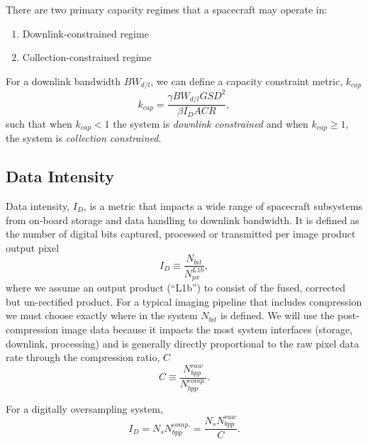 \documentclass[10pt,journal]{IEEEtran}  %
\begin{document}
There are two primary capacity regimes that a spacecraft may operate in:
\begin{enumerate}
\item Downlink-constrained regime
\item Collection-constrained regime
\end{enumerate}

For a downlink bandwidth $BW_{d/l}$, we can define a capacity constraint metric, $k_{cap}$
\begin{equation}
k_{cap} = \frac{\gamma BW_{d/l} GSD^2}{\beta I_D ACR},
\end{equation}
such that when $k_{cap} < 1$ the system is \emph{downlink constrained} and when $k_{cap} \geq 1$, the system is \emph{collection constrained}.



\subsection{Data Intensity}

Data intensity, $I_D$, is a metric that impacts a wide range of spacecraft subsystems from on-board storage and data handling to downlink bandwidth.  It is defined as the number of digital bits captured, processed or transmitted per image product output pixel
\begin{equation}
    I_D \equiv \frac{N_{bit}}{N_{px}^{L1b}},
\end{equation}
where we assume an output product (``L1b'') to consist of the fused, corrected but un-rectified product. For a typical imaging pipeline that includes compression we must choose exactly where in the system $N_{bit}$ is defined.  We will use the post-compression image data because it impacts the most system interfaces (storage, downlink, processing) and is generally directly proportional to the raw pixel data rate through the compression ratio, $C$
\begin{equation}
    \label{eq:compression}
    C \equiv \frac{N_{bpp}^{raw}}{N_{bpp}^{comp.}}.
\end{equation}

For a digitally oversampling system,
\begin{equation}
    I_D = N_s N_{bpp}^{comp.} = \frac{N_s N_{bpp}^{raw}}{C}.
\end{equation}
\end{document}
